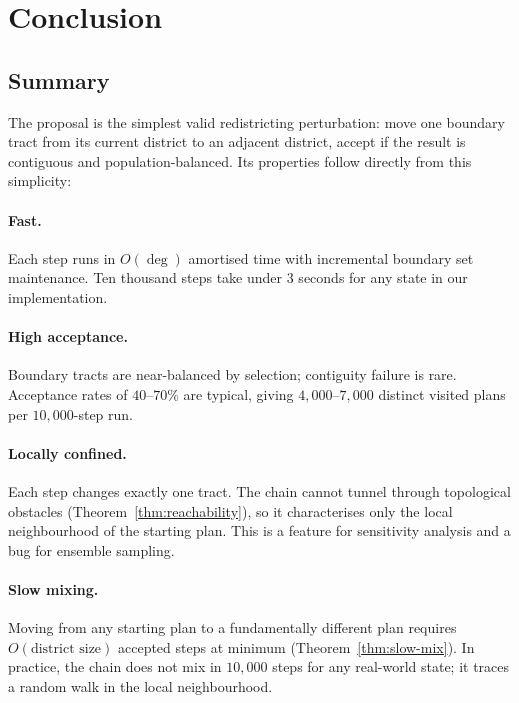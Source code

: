 \section{Conclusion}
\label{sec:conclusion}

\subsection{Summary}

The \flip{} proposal is the simplest valid redistricting perturbation: move
one boundary tract from its current district to an adjacent district, accept
if the result is contiguous and population-balanced.
Its properties follow directly from this simplicity:

\paragraph{Fast.}
Each step runs in $O(\deg)$ amortised time with incremental boundary set
maintenance.
Ten thousand steps take under 3 seconds for any state in our implementation.

\paragraph{High acceptance.}
Boundary tracts are near-balanced by selection; contiguity failure is rare.
Acceptance rates of $40$--$70\%$ are typical, giving $4{,}000$--$7{,}000$
distinct visited plans per $10{,}000$-step run.

\paragraph{Locally confined.}
Each \flip{} step changes exactly one tract.
The chain cannot tunnel through topological obstacles (Theorem~\ref{thm:reachability}),
so it characterises only the local neighbourhood of the starting plan.
This is a feature for sensitivity analysis and a bug for ensemble sampling.

\paragraph{Slow mixing.}
Moving from any starting plan to a fundamentally different plan requires
$O(\text{district size})$ accepted steps at minimum (Theorem~\ref{thm:slow-mix}).
In practice, the chain does not mix in $10{,}000$ steps for any real-world
state; it traces a random walk in the local neighbourhood.

